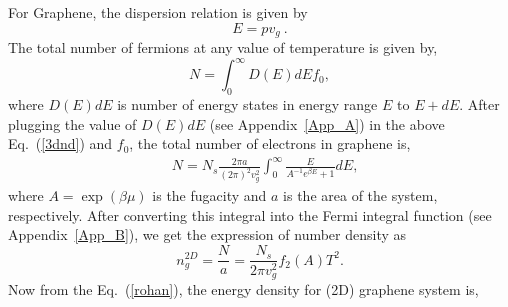 \documentclass[%
 reprint,
 amsmath,amssymb,
 aps,
]{revtex4-2}
\begin{document}
    For Graphene, the dispersion relation is given by
    \begin{equation}
    E = pv_g~.
    \label{nanu}
    \end{equation}
    The total number of fermions at any value of temperature is given by,
    \begin{equation}
    N = \int_0^{\infty}D\left(E\right)dE f_0,
    \label{3dnd}
    \end{equation}
    where $D\left(E\right)dE$ is number of energy states in energy range $E$ to $E+dE$.
%
    After plugging the value of $D\left(E\right)dE$ (see Appendix~\ref{App_A}) in the above Eq.~(\ref{3dnd}) and $f_0$, the total number of electrons in graphene is,
    \begin{align*}
    &N = N_s \frac{2\pi a}{\left(2\pi\right)^2 v_g^2} \int_{0}^{\infty}  \frac{E}{A^{-1}e^{\beta E} + 1} dE,
    \end{align*}
    where $A=\exp{(\beta \mu)}$ is the fugacity and $a$ is the area of the system, respectively. After converting this integral into the Fermi integral function (see Appendix~\ref{App_B}), we get the expression of number density as 
    \begin{equation}
    n_g^{2D} = \frac{N}{a} = \frac{N_s}{2 \pi v_g^2} f_2\left(A\right) T^2.
    \end{equation}
%
    Now from the Eq.~(\ref{rohan}), the energy density for (2D) graphene system is,
\end{document}
